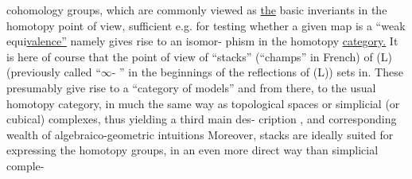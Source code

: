cohomology groups, which are commonly viewed as \uline{the} basic inveriants
in the homotopy point of view, sufficient e.g. for testing whether a
given map  is a ``weak equi\uline{valence''} namely gives rise to an isomor-%
phism in the homotopy \uline{category.}\hand{||}\margin{$\lrcorner$||} It is here of course that the point of
view of ``stacks'' (``champs'' in French) of (L) (previously called ``$\infty$-
'' in the beginnings of the reflections of (L)) sets in. These
presumably give rise to a ``category of models'' and from there, to the
usual homotopy category, in much the same way as topological spaces
or simplicial (or cubical) complexes, thus yielding a third main des-%
cription , and corresponding wealth of algebraico-geometric intuitions
 Moreover, stacks are ideally suited for expressing
the homotopy groups, in an even more direct way than simplicial comple-%
